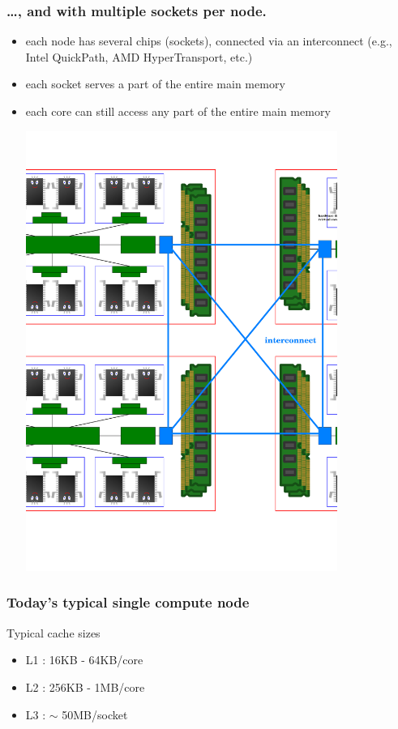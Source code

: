 \documentclass[12pt,dvipdfmx]{beamer}
\begin{document}
\begin{frame}
\frametitle{\ldots, and with multiple sockets per node.}
\begin{itemize}
\item each node has several chips (sockets), connected via an
interconnect (e.g., Intel QuickPath, AMD HyperTransport, etc.)
\item each socket serves a part of the entire main memory
\item each core can still access any part of the entire main memory

\begin{center}
\includegraphics[width=0.8\textwidth]{out/pdf/svg/diagram_multisocket.pdf}
\end{center}
\end{itemize}
\end{frame}


\begin{frame}
\frametitle{Today's typical single compute node}
\begin{center}
\def\svgwidth{0.6\textwidth}
{\footnotesize}
\end{center}

Typical cache sizes
\begin{itemize}
\item L1 : 16KB - 64KB/core
\item L2 : 256KB - 1MB/core
\item L3 : $\sim$ 50MB/socket
\end{itemize}

\end{frame}
\end{document}
